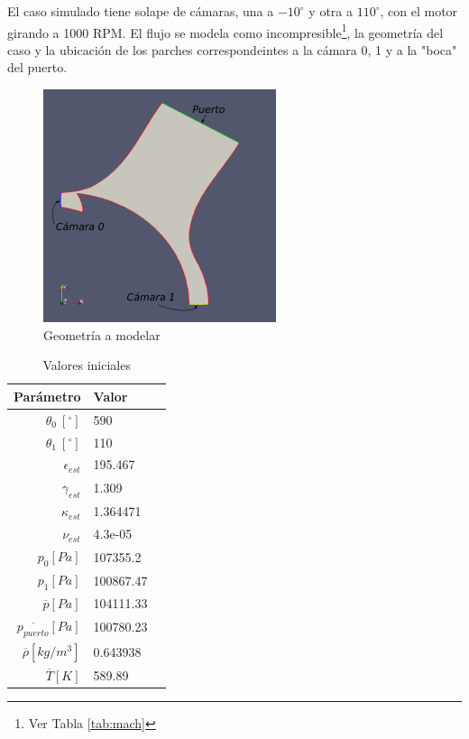 \documentclass[11pt]{article}
\begin{document}
El caso simulado tiene solape de cámaras, una a $-10^{\circ}$ y otra a
$110^{\circ}$, con el motor girando a 1000 RPM.
%
El flujo se modela como incompresible\footnote{Ver Tabla \ref{tab:mach}}, la
geometría del caso y la ubicación de los parches correspondeintes a la cámara
0, 1 y a la "boca" del puerto.

\begin{figure}
    \centering
    \includegraphics{caso0.png}
    \caption{Geometría a modelar}
    \label{fig:caso0}
\end{figure}

\begin{table}
    \centering
    \begin{tabular}{rll}\toprule
        Parámetro & Valor \\ \midrule
        $\theta_0\ [^{\circ}]$ & 590 \\
        $\theta_1\ [^{\circ}]$ & 110 \\
        $\epsilon_{est}$ & 195.467 \\
        $\gamma_{est}$ & 1.309 \\
        $\kappa_{est}$ & 1.364471 \\
        $\nu_{est}$ & 4.3e-05 \\
        $p_0 [Pa]$ & 107355.2 \\
        $p_1 [Pa]$ & 100867.47 \\
        $\overline{p} [Pa]$ & 104111.33 \\
        $\overline{p_{puerto}} [Pa]$ & 100780.23 \\
        $\overline{\rho} [kg/m^3]$ & 0.643938 \\
        $\overline{T} [K]$ & 589.89 \\ \bottomrule
    \end{tabular}
    \caption{Valores iniciales}
    \label{tab:caso0_ci}
\end{table}
\end{document}
